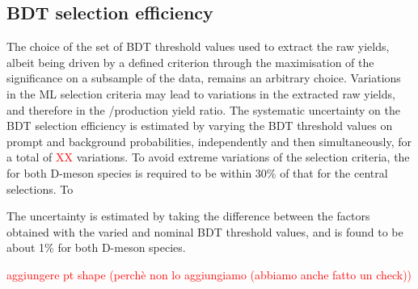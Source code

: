 \subsection{BDT selection efficiency}
The choice of the set of BDT threshold values used to extract the raw yields, albeit being driven by a defined criterion through the maximisation of the significance on a subsample of the data, remains an arbitrary choice. Variations in the ML selection criteria may lead to variations in the extracted raw yields, and therefore in the \ds/\dpl production yield ratio. The systematic uncertainty on the BDT selection efficiency is estimated by varying the BDT threshold values on prompt and background probabilities, independently and then simultaneously, for a total of \textcolor{red}{XX} variations. To avoid extreme variations of the selection criteria, the \aeffp for both D-meson species is required to be within 30\% of that for the central selections. To 


The uncertainty is estimated by taking the difference between the \fp factors obtained with the varied and nominal BDT threshold values, and is found to be about 1\% for both D-meson species.



\textcolor{red}{aggiungere pt shape (perchè non lo aggiungiamo (abbiamo anche fatto un check))}